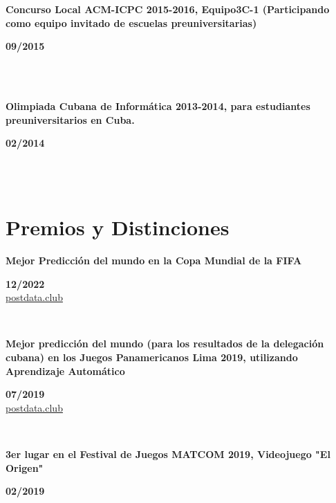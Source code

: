 \documentclass{article}
\begin{document}
\begin{minipage}{0.8\textwidth}
\parbox{0.8\linewidth}{\textbf{Concurso Local ACM-ICPC 2015-2016, Equipo3C-1 (Participando como equipo invitado de escuelas preuniversitarias)}} \hfill \textbf{09/2015}\\
\\
\end{minipage}\\
\begin{minipage}{0.8\textwidth}
\parbox{0.8\linewidth}{\textbf{Olimpiada Cubana de Informática 2013-2014, para estudiantes preuniversitarios en Cuba.}} \hfill \textbf{02/2014}\\
\\
\end{minipage}\\

\section*{Premios y Distinciones}
\begin{minipage}{0.8\textwidth}
\parbox{0.8\linewidth}{\textbf{Mejor Predicción del mundo en la Copa Mundial de la FIFA}} \hfill \textbf{12/2022}\\
\href{https://www.postdata.club/suplementos/mundial-qatar/pronosticando-qatar.html}{postdata.club}
\\
\end{minipage} \hfill {}\\
\begin{minipage}{0.8\textwidth}
\parbox{0.8\linewidth}{\textbf{Mejor predicción del mundo (para los resultados de la delegación cubana) en los Juegos Panamericanos Lima 2019, utilizando Aprendizaje Automático}} \hfill \textbf{07/2019}\\
\href{http://www.postdata.club/issues/201907/el-medallero-de-lima-2019-que-se-puede-esperar.html}{postdata.club}
\\
\end{minipage} \hfill {}\\
\begin{minipage}{0.8\textwidth}
\parbox{0.8\linewidth}{\textbf{3er lugar en el Festival de Juegos MATCOM 2019, Videojuego "El Origen"}} \hfill \textbf{02/2019}\\
\\
\end{minipage}\\
\end{document}
